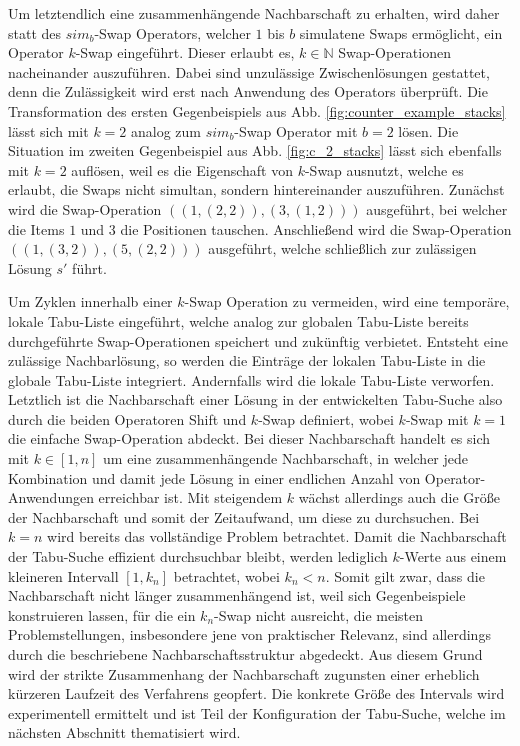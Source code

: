 Um letztendlich eine zusammenhängende Nachbarschaft zu erhalten, wird daher statt des $sim_b$-Swap Operators,
welcher $1$ bis $b$ simulatene Swaps ermöglicht, ein Operator $k$-Swap eingeführt. Dieser erlaubt es, $k \in \mathbb{N}$
Swap-Operationen nacheinander auszuführen. Dabei sind unzulässige Zwischenlösungen gestattet, denn die Zulässigkeit
wird erst nach Anwendung des Operators überprüft. Die Transformation des ersten Gegenbeispiels aus Abb. \ref{fig:counter_example_stacks}
lässt sich mit $k = 2$ analog zum $sim_b$-Swap Operator mit $b = 2$ lösen.
Die Situation im zweiten Gegenbeispiel aus Abb. \ref{fig:c_2_stacks} lässt sich ebenfalls mit $k = 2$ auflösen,
weil es die Eigenschaft von $k$-Swap ausnutzt, welche es erlaubt, die Swaps nicht simultan, sondern hintereinander
auszuführen. Zunächst wird die Swap-Operation $((1, (2, 2)), (3, (1, 2)))$ ausgeführt, bei welcher die Items $1$ und $3$
die Positionen tauschen. Anschließend wird die Swap-Operation $((1, (3, 2)), (5, (2, 2)))$ ausgeführt,
welche schließlich zur zulässigen Lösung $s'$ führt.

Um Zyklen innerhalb einer $k$-Swap Operation zu vermeiden, wird eine temporäre, lokale Tabu-Liste eingeführt,
welche analog zur globalen Tabu-Liste bereits durchgeführte Swap-Operationen speichert und zukünftig verbietet.
Entsteht eine zulässige Nachbarlösung, so werden die Einträge der lokalen Tabu-Liste in die globale Tabu-Liste
integriert. Andernfalls wird die lokale Tabu-Liste verworfen.
Letztlich ist die Nachbarschaft einer Lösung in der entwickelten Tabu-Suche also durch die beiden Operatoren
Shift und  $k$-Swap definiert, wobei $k$-Swap mit $k = 1$ die einfache Swap-Operation abdeckt.
Bei dieser Nachbarschaft handelt es sich mit $k \in [1, n]$ um eine zusammenhängende Nachbarschaft, in
welcher jede Kombination und damit jede Lösung in einer endlichen Anzahl von Operator-Anwendungen erreichbar ist.
Mit steigendem $k$ wächst allerdings auch die Größe der Nachbarschaft und somit der Zeitaufwand, um diese zu durchsuchen.
Bei $k = n$ wird bereits das vollständige Problem betrachtet.
Damit die Nachbarschaft der Tabu-Suche effizient durchsuchbar bleibt, werden lediglich $k$-Werte aus einem kleineren Intervall
$[1, k_n]$ betrachtet, wobei $k_n < n$. Somit gilt zwar, dass die Nachbarschaft nicht länger zusammenhängend ist, weil sich Gegenbeispiele konstruieren lassen, für die ein $k_n$-Swap nicht ausreicht, die meisten Problemstellungen, insbesondere jene von praktischer Relevanz, sind allerdings durch die beschriebene Nachbarschaftsstruktur abgedeckt. Aus diesem Grund wird der strikte Zusammenhang der Nachbarschaft zugunsten einer erheblich kürzeren Laufzeit des Verfahrens geopfert. Die konkrete Größe des Intervals
wird experimentell ermittelt und ist Teil der Konfiguration der Tabu-Suche, welche im nächsten Abschnitt thematisiert wird.

